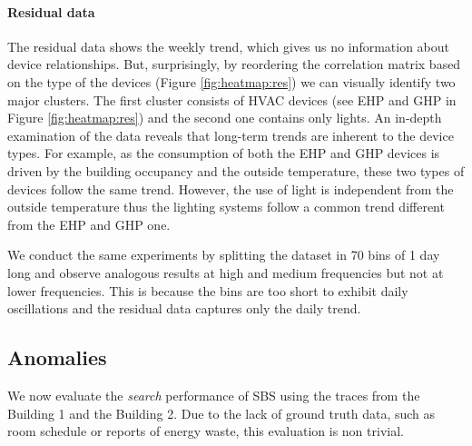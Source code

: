 \paragraph{Residual data}
The residual data shows the weekly trend, which gives us no information about device relationships.
But, surprisingly, by reordering the correlation matrix based on the type of the devices (Figure \ref{fig:heatmap:res}) 
we can visually identify two major clusters.
The first cluster consists of HVAC devices (see EHP and GHP in Figure \ref{fig:heatmap:res}) and the second one contains only lights. 
An in-depth examination of the data reveals that long-term trends are inherent to the device types. 
For example, as the consumption of both the EHP and GHP devices is driven by the building occupancy and the outside temperature, these two types of devices follow the same trend. 
However, the use of light is independent from the outside temperature thus the lighting systems follow a common trend different from the EHP and GHP one.

We conduct the same experiments by splitting the dataset in 70 bins of 1 day long and observe analogous results at high and medium frequencies but not at lower frequencies.  This is because the bins are too short to exhibit daily oscillations and the residual data captures only the daily trend.


\subsection{Anomalies}
We now evaluate the \emph{search} performance of SBS using the traces from the Building 1 and the Building 2.
Due to the lack of ground truth data, such as room schedule or reports of energy waste, this evaluation is non trivial.


